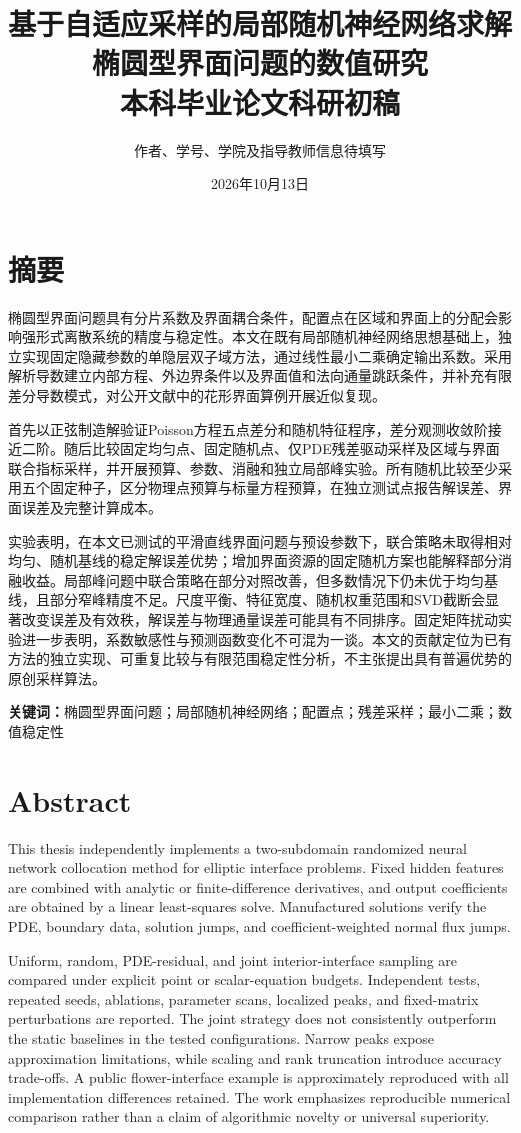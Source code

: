 \documentclass[UTF8,12pt,oneside]{ctexbook}
\title{基于自适应采样的局部随机神经网络求解椭圆型界面问题的数值研究\\[1em]\large 本科毕业论文科研初稿}
\author{作者、学号、学院及指导教师信息待填写}
\date{2026年10月13日}
\theoremstyle{definition}
\begin{document}
\frontmatter
\maketitle
\chapter*{摘要}
椭圆型界面问题具有分片系数及界面耦合条件，配置点在区域和界面上的分配会影响强形式离散系统的精度与稳定性。本文在既有局部随机神经网络思想基础上，独立实现固定隐藏参数的单隐层双子域方法，通过线性最小二乘确定输出系数。采用解析导数建立内部方程、外边界条件以及界面值和法向通量跳跃条件，并补充有限差分导数模式，对公开文献中的花形界面算例开展近似复现。

首先以正弦制造解验证Poisson方程五点差分和随机特征程序，差分观测收敛阶接近二阶。随后比较固定均匀点、固定随机点、仅PDE残差驱动采样及区域与界面联合指标采样，并开展预算、参数、消融和独立局部峰实验。所有随机比较至少采用五个固定种子，区分物理点预算与标量方程预算，在独立测试点报告解误差、界面误差及完整计算成本。

实验表明，在本文已测试的平滑直线界面问题与预设参数下，联合策略未取得相对均匀、随机基线的稳定解误差优势；增加界面资源的固定随机方案也能解释部分消融收益。局部峰问题中联合策略在部分对照改善，但多数情况下仍未优于均匀基线，且部分窄峰精度不足。尺度平衡、特征宽度、随机权重范围和SVD截断会显著改变误差及有效秩，解误差与物理通量误差可能具有不同排序。固定矩阵扰动实验进一步表明，系数敏感性与预测函数变化不可混为一谈。本文的贡献定位为已有方法的独立实现、可重复比较与有限范围稳定性分析，不主张提出具有普遍优势的原创采样算法。

\noindent\textbf{关键词：}椭圆型界面问题；局部随机神经网络；配置点；残差采样；最小二乘；数值稳定性
\chapter*{Abstract}
This thesis independently implements a two-subdomain randomized neural network collocation method for elliptic interface problems. Fixed hidden features are combined with analytic or finite-difference derivatives, and output coefficients are obtained by a linear least-squares solve. Manufactured solutions verify the PDE, boundary data, solution jumps, and coefficient-weighted normal flux jumps.

Uniform, random, PDE-residual, and joint interior-interface sampling are compared under explicit point or scalar-equation budgets. Independent tests, repeated seeds, ablations, parameter scans, localized peaks, and fixed-matrix perturbations are reported. The joint strategy does not consistently outperform the static baselines in the tested configurations. Narrow peaks expose approximation limitations, while scaling and rank truncation introduce accuracy trade-offs. A public flower-interface example is approximately reproduced with all implementation differences retained. The work emphasizes reproducible numerical comparison rather than a claim of algorithmic novelty or universal superiority.
\end{document}
